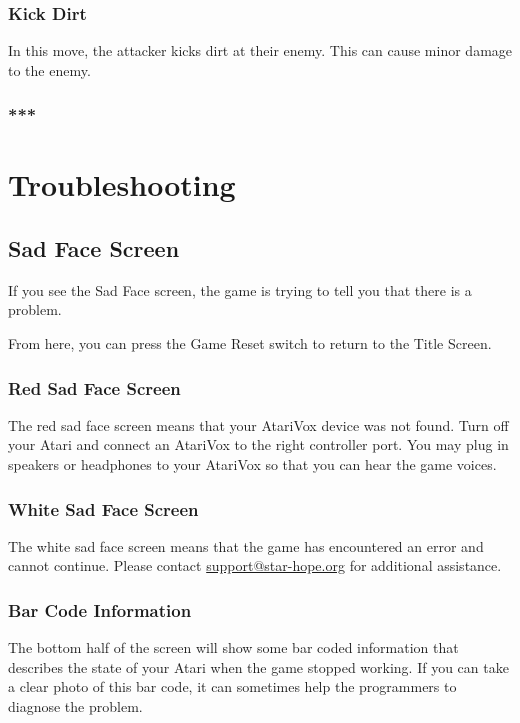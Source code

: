 \documentclass[12pt,twoside,openright,book]{memoir}
\begin{document}
\begin{description}
\subsection{Kick Dirt}

In this  move, the attacker  kicks dirt at  their enemy. This  can cause
minor damage to the enemy.

\subsection{***}

\chapter{Troubleshooting}

\section{Sad Face Screen}

If you see the Sad Face screen, the game is trying to tell you that
there is a problem.

From here, you can press the Game Reset switch to return to the Title
Screen. 

\subsection{Red Sad Face Screen}

The red sad  face screen means that your AtariVox  device was not found. 
Turn off your Atari and connect an AtariVox to the right controller port. 
You may plug in speakers or headphones to your AtariVox so that you can hear
the game voices.

\subsection{White Sad Face Screen}

The white sad  face screen means that the game  has encountered an error and
cannot continue.  Please contact
\href{mailto:support@star-hope.org}{support@star-hope.org} for additional
assistance.

\subsection{Bar Code Information}

The bottom half of the screen will show some bar coded information
that describes the state of your Atari when the game stopped
working. If you can take a clear photo of this bar code, it can
sometimes help the programmers to diagnose the problem.


\end{description}
\end{document}
